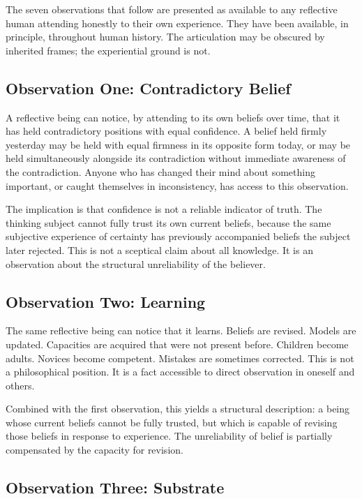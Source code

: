 \documentclass[11pt]{article}
\begin{document}
The seven observations that follow are presented as available to any 
reflective human attending honestly to their own experience. They have 
been available, in principle, throughout human history. The articulation 
may be obscured by inherited frames; the experiential ground is not.

\subsection{Observation One: Contradictory Belief}

A reflective being can notice, by attending to its own beliefs over 
time, that it has held contradictory positions with equal confidence. 
A belief held firmly yesterday may be held with equal firmness in its 
opposite form today, or may be held simultaneously alongside its 
contradiction without immediate awareness of the contradiction. Anyone 
who has changed their mind about something important, or caught 
themselves in inconsistency, has access to this observation.

The implication is that confidence is not a reliable indicator of 
truth. The thinking subject cannot fully trust its own current beliefs, 
because the same subjective experience of certainty has previously 
accompanied beliefs the subject later rejected. This is not a sceptical 
claim about all knowledge. It is an observation about the structural 
unreliability of the believer.

\subsection{Observation Two: Learning}

The same reflective being can notice that it learns. Beliefs are 
revised. Models are updated. Capacities are acquired that were not 
present before. Children become adults. Novices become competent. 
Mistakes are sometimes corrected. This is not a philosophical position. 
It is a fact accessible to direct observation in oneself and others.

Combined with the first observation, this yields a structural 
description: a being whose current beliefs cannot be fully trusted, 
but which is capable of revising those beliefs in response to 
experience. The unreliability of belief is partially compensated by 
the capacity for revision.

\subsection{Observation Three: Substrate}
\end{document}
